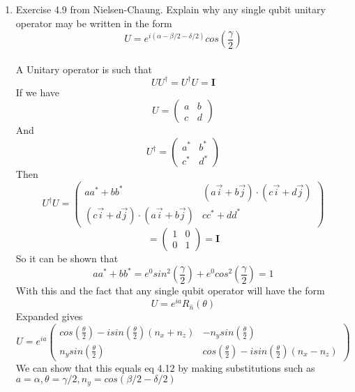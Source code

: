 \documentclass[12pt]{article}
\begin{document}
\begin{enumerate}
    \item Exercise 4.9 from Nielsen-Chaung. Explain why any single qubit unitary operator may be written in the form 
    $$ U = e^{i(\alpha - \beta /2 - \delta /2)} cos(\frac{\gamma}{2}) $$
    \\
    A Unitary operator is such that 
    $$ U U^\dagger = U^\dagger U = \textbf{I} $$ 
    If we have 
    $$ U =  \left(\begin{array}{cc} a & b \\  c & d\end{array}\right)$$
    And 
    $$ U^\dagger = \left(\begin{array}{cc} a^* & b^* \\  c^* & d^*\end{array}\right)$$
    Then 
    $$ U^\dagger U = \left(\begin{array}{cc} aa^* + bb^* & (a \vec{i}+ b \vec{j}) \cdot (c \vec{i} + d \vec{j})  \\ (c \vec{i}+ d \vec{j}) \cdot (a \vec{i} + b \vec{j})   & cc^* + dd^*\end{array}\right)$$
    $$ =  \left(\begin{array}{cc} 1 & 0 \\  0 & 1\end{array}\right) = \textbf{I} $$
    So it can be shown that 
    $$ aa^* + bb^* = e^0 sin^2 (\frac{\gamma}{2}) + e^0 cos^2 (\frac{\gamma}{2}) = 1$$
    With this and the fact that any single qubit operator will have the form 
    $$ U = e^{ia} R_{\hat{n}} (\theta) $$
    Expanded gives 
    $$ U = e^{ia}  \left(\begin{array}{cc} cos(\frac{\theta}{2})-isin(\frac{\theta}{2})(n_x + n_z) & -n_y sin(\frac{\theta}{2})  \\  n_y sin(\frac{\theta}{2}) & cos(\frac{\theta}{2}) -isin(\frac{\theta}{2})(n_x - n_z)\end{array}\right)$$
    We can show that this equals eq 4.12 by making substitutions such as $a = \alpha, \theta = \gamma /2, n_y = cos(\beta /2 - \delta /2 )$


\end{enumerate}
\end{document}
